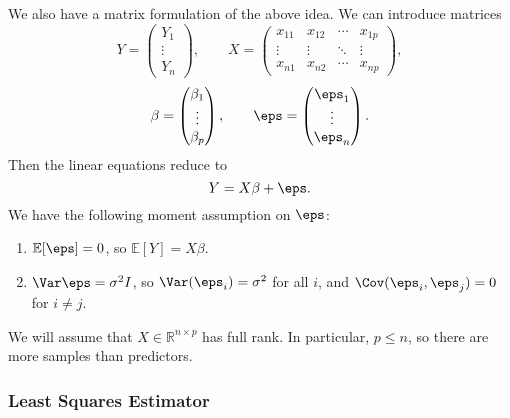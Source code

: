 \documentclass[12pt]{article}
\begin{document}
We also have a matrix formulation of the above idea. We can introduce matrices
\[
Y =
\begin{pmatrix}
	Y_1\\\vdots\\Y_n
\end{pmatrix}
,\qquad
X=
\begin{pmatrix}
	x_{11}&x_{12}&\cdots&x_{1p}\\\vdots&\vdots&\ddots&\vdots\\x_{n1}&x_{n2}&\cdots&x_{np}
\end{pmatrix}
,
\]
\[
\beta =
\begin{pmatrix}
	\beta_1\\\vdots\\\beta_p
\end{pmatrix}
,\qquad \eps=
\begin{pmatrix}
	\eps_1\\\vdots\\\eps_n
\end{pmatrix}.
\]
Then the linear equations reduce to
\[
Y = X\beta + \eps.
\]
We have the following moment assumption on $\eps$:
\begin{enumerate}
	\item $\mathbb{E}[\eps] = 0$, so $\mathbb{E}[Y] = X\beta$.
	\item $\Var \eps =\sigma^2I$, so $\Var(\eps_i) = \sigma^2$ for all $i$, and $\Cov(\eps_i, \eps_j) = 0$ for $i\neq j$.
\end{enumerate}
We will assume that $X \in \mathbb{R}^{n \times p}$ has full rank. In particular, $p \leq n$, so there are more samples than predictors.

\subsubsection{Least Squares Estimator}
\label{subsub:least_squares_estimator}
\end{document}
